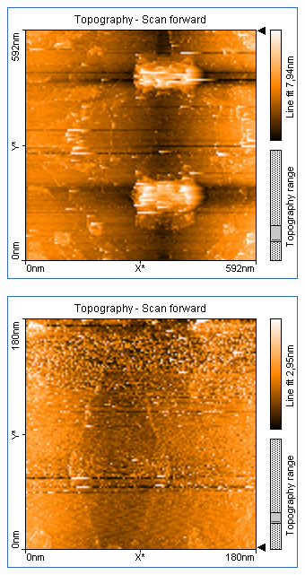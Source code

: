 \newcommand{\picwidth}{0.45\textwidth}
\centering
\begin{figure}
    \begin{subfigure}[b]{\picwidth}
        \includegraphics[width=\textwidth]{data/Graphit/pic_01_01_600nm}
        \caption{}
        \label{fig:graphit_01_01}
    \end{subfigure}\qquad
    \begin{subfigure}[b]{\picwidth}
        \includegraphics[width=\textwidth]{data/Graphit/pic_01_02_180nm}

\end{subfigure}
\end{figure}
